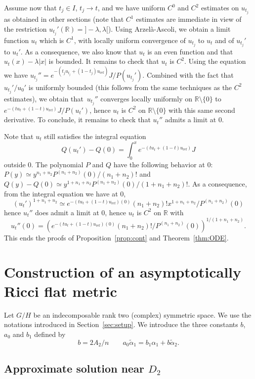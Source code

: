 \documentclass[10pt]{amsart}
\theoremstyle{plain}
\theoremstyle{definition}
\begin{document}
Assume now that $t_j\in I$, $t_j\to t$, and we have uniform
$C^0$ and $C^2$ estimates on $u_{t_j}$ as obtained in other sections
(note that $C^1$ estimates are immediate in view of the restriction
$u_{t_j}'(\mathbb{R})={}]-\lambda,\lambda[$).
Using Arzelà-Ascoli, we obtain a limit function $u_t$ which is $C^1$,
with locally uniform convergence of $u_{t_j}$ to $u_t$ and of
$u_{t_j}'$ to $u_t'$. As a consequence, we also know that $u_t$ is an
even function and that $u_t(x)-\lambda |x|$ is bounded. It remains to
check that $u_t$ is $C^2$. Using the equation we have
$u_{t_j}''=e^{-(t_ju_{t_j}+(1-t_j)u_{\mathrm{ref}})}J/P(u_{t_j}')$.
Combined with the fact that $u_{t_j}'/u_0'$ is uniformly bounded (this
follows from the same techniques as the $C^2$ estimates), we obtain that~$u_{t_j}''$ converges locally uniformly on $\mathbb{R}\setminus \{0\}$ to
$e^{-(tu_t+(1-t)u_{\mathrm{ref}})}J/P(u_t')$, hence $u_t$ is $C^2$ on
$\mathbb{R}\setminus \{0\}$ with this same second derivative.
To conclude, it remains to check that $u_t''$ admits a limit at $0$.

Note that $u_t$ still satisfies the integral equation
\[ Q(u_t')-Q(0)=\int_0^xe^{-(tu_t+(1-t)u_{\mathrm{ref}})}J \]
outside $0$.
The polynomial $P$ and $Q$ have the following behavior at $0$:
$P(y)\simeq y^{n_1+n_2}P^{(n_1+n_2)}(0)/(n_1+n_2)!$ and
$Q(y)-Q(0)\simeq y^{1+n_1+n_2}P^{(n_1+n_2)}(0)/(1+n_1+n_2)!$.
As a consequence, from the integral equation we have at $0$,
\[ (u_t')^{1+n_1+n_2}\simeq e^{-(tu_t+(1-t)u_{\mathrm{ref}})(0)}(n_1+n_2)!x^{1+n_1+n_2}/P^{(n_1+n_2)}(0) \]
hence $u_t''$ does admit a limit at $0$, hence $u_t$ is $C^2$
on $\mathbb{R}$ with
\[ u_t''(0)=\left(e^{-(tu_t+(1-t)u_{\mathrm{ref}})(0)}(n_1+n_2)!/P^{(n_1+n_2)}(0)\right)^{1/(1+n_1+n_2)}. \]
This ends the proofs of Proposition~\ref{prop:cont} and Theorem~\ref{thm:ODE}.


\section{Construction of an asymptotically Ricci flat metric}
\label{sec:constr-an-asympt}

Let $G/H$ be an indecomposable rank two (complex) symmetric space. We use the notations introduced in Section~\ref{sec:setup}.
We introduce the three constants $b$, $a_0$ and $b_1$ defined by
\[ b=2A_2/n \qquad a_0\tilde{\alpha}_1=b_1\alpha_1+b\tilde{\alpha}_2. \]

\subsection{Approximate solution near $D_2$}
\label{sec:appr-solut-near}
\end{document}
